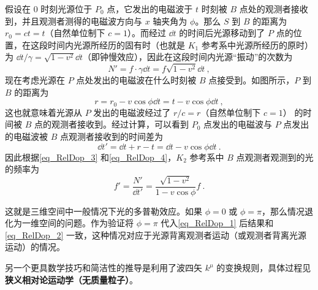 假设在 $0$ 时刻光源位于 $P_0$ 点，它发出的电磁波于 $t$ 时刻被 $B$ 点处的观测者接收到，并且观测者测得的电磁波方向与 $x$ 轴夹角为 $\phi$。那么 $S$ 到 $B$ 的距离为 $r_0=ct=t$（自然单位制下 $c=1$）。而经过 $\dd t$ 的时间后光源移动到了 $P$ 点的位置，在这段时间内光源所经历的固有时（也就是 $K_1$ 参考系中光源所经历的原时）为 $\dd t/\gamma=\sqrt{1-v^2}\dd t$（即钟慢效应），因此在这段时间内光源“振动”的次数为
\begin{equation}\label{eq_RelDop_3}
N'=f\cdot \gamma \dd t = f\sqrt{1-v^2}\dd t~,
\end{equation}
现在考虑光源在 $P$ 点处发出的电磁波在什么时刻被 $B$ 点接受到。如图所示，$P$ 到 $B$ 的距离为
\begin{equation}
r=r_0-v\cos\phi \dd t=t-v\cos\phi\dd t~,
\end{equation}
这也就意味着光源从 $P$ 发出的电磁波经过了 $r/c=r$（自然单位制下 $c=1$） 的时间被 $B$ 点的观测者接收到。经过计算，可以看到 $P_0$ 点发出的电磁波与 $P$ 点发出的电磁波被 $B$ 点观测者接收到的时间差为
\begin{equation}\label{eq_RelDop_4}
\dd t' = \dd t + r - t = \dd t -v\cos\phi\dd t~.
\end{equation}
因此根据\autoref{eq_RelDop_3} 和\autoref{eq_RelDop_4}，$K_2$ 参考系中 $B$ 点观测者观测到的光的频率为
\begin{equation}\label{eq_RelDop_1}
f'=\frac{N'}{\dd t'}=\frac{\sqrt{1-v^2}}{1-v\cos\phi} f~.
\end{equation}

这就是三维空间中一般情况下光的多普勒效应。如果 $\phi=0$ 或 $\phi=\pi$，那么情况退化为一维空间的问题。作为验证将 $\phi=\pi$ 代入\autoref{eq_RelDop_1} 后结果和\autoref{eq_RelDop_2} 一致，这种情况对应于光源背离观测者运动（或观测者背离光源运动）的情况。

另一个更具数学技巧和简洁性的推导是利用了波四矢 $k^\mu$ 的变换规则，具体过程见\textbf{狭义相对论运动学（无质量粒子）}。